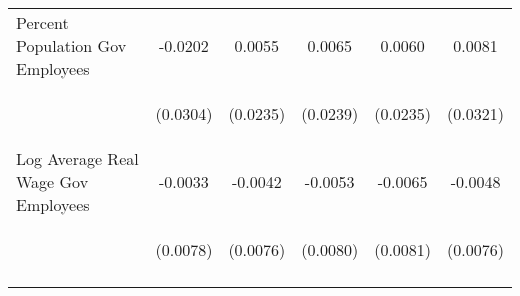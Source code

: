 \begin{center}
\begin{tabular}{lccccc}
\noalign{\smallskip}Percent Population Gov Employees & \begin{scriptsize}-0.0202\end{scriptsize} & \begin{scriptsize}0.0055\end{scriptsize} & \begin{scriptsize}0.0065\end{scriptsize} & \begin{scriptsize}0.0060\end{scriptsize} & \begin{scriptsize}0.0081\end{scriptsize}\\
 & \begin{scriptsize}(0.0304)\end{scriptsize} & \begin{scriptsize}(0.0235)\end{scriptsize} & \begin{scriptsize}(0.0239)\end{scriptsize} & \begin{scriptsize}(0.0235)\end{scriptsize} & \begin{scriptsize}(0.0321)\end{scriptsize}\\
\noalign{\smallskip}Log Average Real Wage Gov Employees & \begin{scriptsize}-0.0033\end{scriptsize} & \begin{scriptsize}-0.0042\end{scriptsize} & \begin{scriptsize}-0.0053\end{scriptsize} & \begin{scriptsize}-0.0065\end{scriptsize} & \begin{scriptsize}-0.0048\end{scriptsize}\\
 & \begin{scriptsize}(0.0078)\end{scriptsize} & \begin{scriptsize}(0.0076)\end{scriptsize} & \begin{scriptsize}(0.0080)\end{scriptsize} & \begin{scriptsize}(0.0081)\end{scriptsize} & \begin{scriptsize}(0.0076)\end{scriptsize}\\
\noalign{\smallskip}\hline\end{tabular}\\
\end{center}
